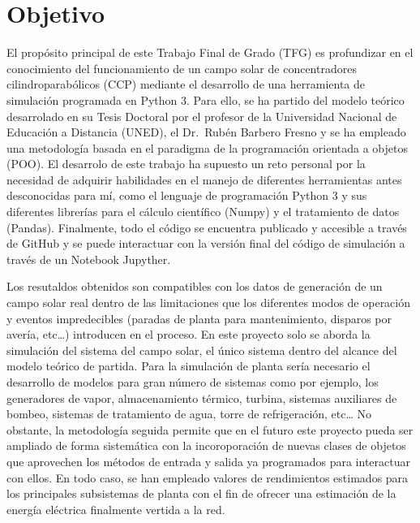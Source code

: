 \documentclass[12pt]{report} %
\begin{document}
\section{Objetivo}
El propósito principal de este Trabajo Final de Grado (TFG) es profundizar en el conocimiento del funcionamiento de un campo solar de concentradores cilindroparabólicos (CCP) mediante el desarrollo de una herramienta de simulación programada en Python 3. Para ello, se ha partido del modelo teórico desarrolado en su Tesis Doctoral por el profesor de la Universidad Nacional de Educación a Distancia (UNED), el Dr.~Rubén Barbero Fresno y se ha empleado una metodología basada en el paradigma de la programación orientada a objetos (POO). El desarrolo de este trabajo ha supuesto un reto personal por la necesidad de adquirir habilidades en el manejo de diferentes herramientas antes desconocidas para mí, como el lenguaje de programación Python 3 y sus diferentes librerías para el cálculo científico (Numpy) y el tratamiento de datos (Pandas). Finalmente, todo el código se encuentra publicado y accesible a través de GitHub y se puede interactuar con la versión final del código de simulación a través de un Notebook Jupyther.

Los resutaldos obtenidos son compatibles con los datos de generación de un campo solar real dentro de las limitaciones que los diferentes modos de operación y eventos impredecibles (paradas de planta para mantenimiento, disparos por avería, etc\ldots{}) introducen en el proceso. En este proyecto solo se aborda la simulación del sistema del campo solar, el único sistema dentro del alcance del modelo teórico de partida. Para la simulación de planta sería necesario el desarrollo de
modelos para gran número de sistemas como por ejemplo, los generadores de vapor, almacenamiento térmico, turbina, sistemas auxiliares de bombeo, sistemas de tratamiento de agua, torre de refrigeración, etc\ldots{} No obstante, la metodología seguida permite que en el futuro este proyecto pueda ser ampliado de forma sistemática con la incoroporación de nuevas clases de objetos que aprovechen los métodos de entrada y salida ya programados para interactuar con ellos. En todo caso, se han empleado valores de rendimientos estimados para los principales subsistemas de planta con el fin de ofrecer una estimación de la energía eléctrica finalmente vertida a la red.
\end{document}
